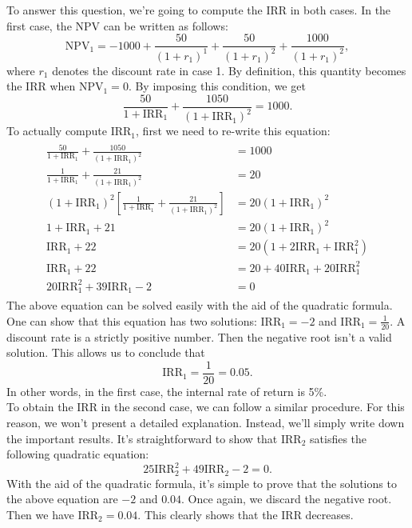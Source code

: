\documentclass[11pt]{article}
\begin{document}
To answer this question, we're going to compute the IRR in both cases. In the
first case, the NPV can be written as follows:
\begin{equation}
\mathrm{NPV}_1=-1000+\frac{50}{(1+r_1)^1}+\frac{50}{(1+r_1)^2}+\frac{1000}{(1+r_1)^2},
\end{equation}
where \(r_1\) denotes the discount rate in case 1. By definition, this
quantity becomes the IRR when \(\mathrm{NPV}_1=0\). By imposing this
condition, we get
\begin{equation}
\frac{50}{1+\mathrm{IRR}_1}+\frac{1050}{(1+\mathrm{IRR}_1)^2}=1000.
\end{equation}
To actually compute \(\mathrm{IRR}_1\), first we need to re-write this
equation:
\begin{align}
  \begin{split}
    \frac{50}{1+\mathrm{IRR}_1}+\frac{1050}{(1+\mathrm{IRR}_1)^2}&=1000\\
    \frac{1}{1+\mathrm{IRR}_1}+\frac{21}{(1+\mathrm{IRR}_1)^2}&=20\\
    (1+\mathrm{IRR}_1)^2\left[\frac{1}{1+\mathrm{IRR}_1}+\frac{21}{(1+\mathrm{IRR}_1)^2}\right]&=20(1+\mathrm{IRR}_1)^2\\
    1+\mathrm{IRR}_1+21&=20(1+\mathrm{IRR}_1)^2\\
    \mathrm{IRR}_1+22&=20(1+2\mathrm{IRR}_1+\mathrm{IRR}_1^2)\\
    \mathrm{IRR}_1+22&=20+40\mathrm{IRR}_1+20\mathrm{IRR}_1^2\\
    20\mathrm{IRR}_1^2+39\mathrm{IRR}_1-2&=0
  \end{split}
\end{align}
The above equation can be solved easily with the aid of the quadratic formula.
One can show that this equation has two solutions: \(\mathrm{IRR}_1=-2\) and
\(\mathrm{IRR}_1=\frac{1}{20}\). A discount rate is a strictly positive
number. Then the negative root isn't a valid solution. This allows us to
conclude that
\begin{equation}
\mathrm{IRR}_1=\frac{1}{20}=0.05.
\end{equation}
In other words, in the first case, the internal rate of return is 5\%.\\
To obtain the IRR in the second case, we can follow a similar procedure. For
this reason, we won't present a detailed explanation. Instead, we'll simply
write down the important results. It's straightforward to show that
\(\mathrm{IRR}_2\) satisfies the following quadratic equation:
\begin{equation}
25\mathrm{IRR}_2^{2}+49\mathrm{IRR}_2-2=0.
\end{equation}
With the aid of the quadratic formula, it's simple to prove that the solutions
to the above equation are \(-2\) and \(0.04\). Once again, we discard the
negative root. Then we have \(\mathrm{IRR}_2=0.04\). This clearly shows that
the IRR decreases.
\end{document}
